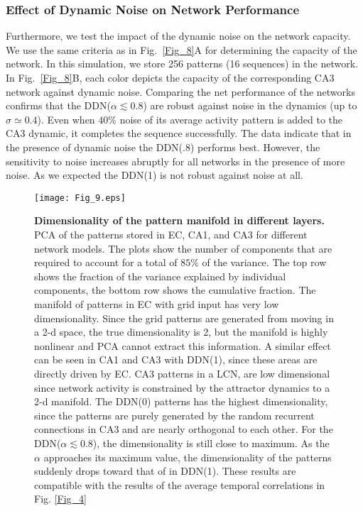 \documentclass[utf8]{frontiersSCNS} %
\begin{document}
\subsubsection{Effect of Dynamic Noise on Network Performance}
Furthermore, we test the impact of the dynamic noise on the network capacity. We use the same criteria as in Fig.~\ref{Fig_8}A for determining the capacity of the network. In this simulation, we store 256 patterns (16 sequences) in the network. 
%
In Fig.~\ref{Fig_8}B, each color depicts the capacity of the corresponding CA3 network against dynamic noise.
%  
Comparing the net performance of the networks confirms that the DDN($\alpha \lesssim 0.8$) are robust against noise in the dynamics (up to $\sigma \simeq 0.4$). 
%
Even when $ 40 \% $ noise of its average activity pattern is added to the CA3 dynamic, it completes the sequence successfully. 
%
The data indicate that in the presence of dynamic noise the DDN(.8) performs best. 
%
However, the sensitivity to noise increases abruptly for all networks in the presence of more noise.
%
As we expected the DDN(1) is not robust against noise at all.
\begin{figure}[!htb]
\centering\texttt{[image: Fig\_9.eps]}
\caption{\textbf{Dimensionality of the pattern manifold in different layers.} PCA of the patterns stored in EC, CA1, and CA3 for different network models. The plots show the number of components that are required to account for a total of $85 \%$ of the variance. The top row shows the fraction of the variance explained by individual components, the bottom row shows the cumulative fraction. The manifold of patterns in EC with grid input has very low dimensionality. Since the grid patterns are generated from moving in a 2-d space, the true dimensionality is 2, but the manifold is highly nonlinear and PCA cannot extract this information. A similar effect can be seen in CA1 and CA3 with DDN(1), since these areas are directly driven by EC. CA3 patterns in a LCN, are low dimensional since network activity is constrained by the attractor dynamics to a 2-d manifold. The DDN(0) patterns has the highest dimensionality, since the patterns are purely generated by the random recurrent connections in CA3 and are nearly orthogonal to each other. For the DDN($\alpha \lesssim 0.8$), the dimensionality is still close to maximum. As the $\alpha$ approaches its maximum value, the dimensionality of the patterns suddenly drops toward that of in DDN(1). These results are compatible with the results of the average temporal correlations in Fig.\: \ref{Fig_4} }
\label{Fig_9}
\end{figure}
\end{document}
